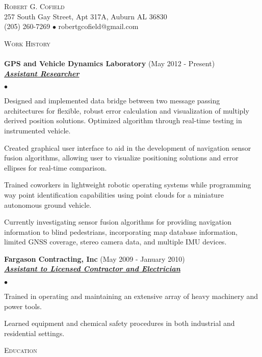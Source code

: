 \documentclass{article}
\newcommand{\lineunder} {
	\vspace*{-8pt} \\
	\hspace*{-18pt} \hrulefill \\
}
\newcommand{\header} [1] {
	{\hspace*{-15pt}\vspace*{6pt} \textsc{#1}} 
	\vspace*{-6pt} \lineunder
}
\newcommand{\employer} [3] {
	{ \textbf{#1} (#2)\\ \underline{\textbf{\emph{#3}}}\\  }
}
\newcommand{\contact} [3] {
	\vspace*{-8pt}
	\begin{center}
		{\LARGE \scshape {#1}}\\
		#2 \\	#3
	\end{center}
	\vspace*{-8pt}
}
\newenvironment{achievements}{
	\begin{list}
		{$\bullet$}{\topsep 0pt \itemsep -2pt}}{\vspace*{4pt}
	\end{list}
}
\begin{document}
\vspace*{-36pt}

\contact{Robert G. Cofield}
{257 South Gay Street, Apt 317A, Auburn AL 36830}
{(205) 260-7269 $\bullet$ robertgcofield@gmail.com}



\header{Work History}

	\employer{GPS and Vehicle Dynamics Laboratory} {May 2012 - Present}
	{Assistant Researcher}
		
		\begin{achievements}
			\item Designed and implemented data bridge between two message passing architectures for flexible, robust error calculation and visualization of multiply derived position solutions. Optimized algorithm through real-time testing in instrumented vehicle.
			\item Created graphical user interface to aid in the development of navigation sensor fusion algorithms, allowing user to visualize positioning solutions and error ellipses for real-time comparison.
			\item Trained coworkers in lightweight robotic operating systems while programming way point identification capabilities using point clouds for a miniature autonomous ground vehicle.
			\item Currently investigating sensor fusion algorithms for providing navigation information to blind pedestrians, incorporating map database information, limited GNSS coverage, stereo camera data, and multiple IMU devices.
		\end{achievements}

	\employer{Fargason Contracting, Inc} {May 2009 - January 2010}
	{Assistant to Licensed Contractor and Electrician}
		
		\begin{achievements}
			\item Trained in operating and maintaining an extensive array of heavy machinery and power tools.
			\item Learned equipment and chemical safety procedures in both industrial and residential settings.
		\end{achievements}



\header{Education}
\end{document}
